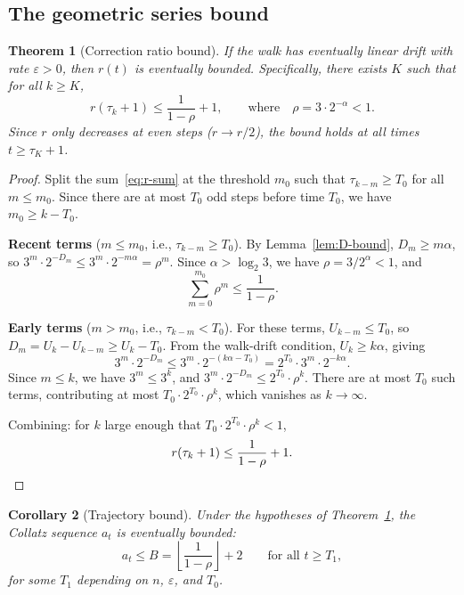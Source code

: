 \documentclass[manuscript]{aomart}
\theoremstyle{plain}
\newtheorem{theorem}{Theorem}[section]
\newtheorem{corollary}[theorem]{Corollary}
\theoremstyle{definition}
\theoremstyle{remark}
\numberwithin{equation}{section}
\begin{document}
\subsection{The geometric series bound}

\begin{theorem}[Correction ratio bound]\label{thm:r-bound}
If the walk has eventually linear drift with rate $\varepsilon > 0$,
then $r(t)$ is eventually bounded.  Specifically, there exists $K$
such that for all $k \ge K$,
\begin{equation}\label{eq:r-bound}
  r(\tau_k + 1) \le \frac{1}{1-\rho} + 1,
  \qquad\text{where}\quad
  \rho = 3 \cdot 2^{-\alpha} < 1.
\end{equation}
Since $r$ only decreases at even steps ($r \to r/2$), the bound holds
at all times $t \ge \tau_K + 1$.
\end{theorem}

\begin{proof}
Split the sum~\eqref{eq:r-sum} at the threshold $m_0$ such that
$\tau_{k-m} \ge T_0$ for all $m \le m_0$.  Since there are at most
$T_0$ odd steps before time $T_0$, we have $m_0 \ge k - T_0$.

\medskip\noindent
\textbf{Recent terms} ($m \le m_0$, i.e., $\tau_{k-m} \ge T_0$).
By Lemma~\ref{lem:D-bound}, $D_m \ge m\alpha$, so
$3^m \cdot 2^{-D_m} \le 3^m \cdot 2^{-m\alpha} = \rho^m$.
Since $\alpha > \log_2 3$, we have $\rho = 3/2^\alpha < 1$, and
\[
  \sum_{m=0}^{m_0} \rho^m \le \frac{1}{1-\rho}.
\]

\medskip\noindent
\textbf{Early terms} ($m > m_0$, i.e., $\tau_{k-m} < T_0$).
For these terms, $U_{k-m} \le T_0$, so
$D_m = U_k - U_{k-m} \ge U_k - T_0$.  From the walk-drift condition,
$U_k \ge k\alpha$, giving
\[
  3^m \cdot 2^{-D_m}
  \le 3^m \cdot 2^{-(k\alpha - T_0)}
  = 2^{T_0} \cdot 3^m \cdot 2^{-k\alpha}.
\]
Since $m \le k$, we have $3^m \le 3^k$, and
$3^m \cdot 2^{-D_m} \le 2^{T_0} \cdot \rho^k$.
There are at most $T_0$ such terms, contributing at most
$T_0 \cdot 2^{T_0} \cdot \rho^k$, which vanishes as $k \to \infty$.

\medskip
Combining: for $k$ large enough that
$T_0 \cdot 2^{T_0} \cdot \rho^k < 1$,
\[
  r(\tau_k + 1) \le \frac{1}{1-\rho} + 1. \qedhere
\]
\end{proof}

\begin{corollary}[Trajectory bound]\label{cor:bounded}
Under the hypotheses of Theorem~\ref{thm:r-bound}, the Collatz
sequence $a_t$ is eventually bounded:
\[
  a_t \le B = \left\lfloor \frac{1}{1-\rho} \right\rfloor + 2
  \qquad\text{for all } t \ge T_1,
\]
for some $T_1$ depending on $n$, $\varepsilon$, and $T_0$.
\end{corollary}
\end{document}
